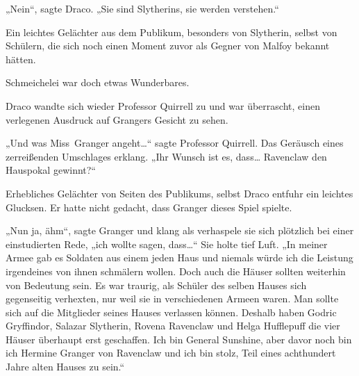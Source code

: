 „Nein“, sagte Draco. „Sie sind Slytherins, sie werden verstehen.“

Ein leichtes Gelächter aus dem Publikum, besonders von Slytherin, selbst von Schülern, die sich noch einen Moment zuvor als Gegner von Malfoy bekannt hätten.

Schmeichelei war doch etwas Wunderbares.

Draco wandte sich wieder Professor Quirrell zu und war überrascht, einen verlegenen Ausdruck auf Grangers Gesicht zu sehen.

„Und was Miss~Granger angeht…“ sagte Professor Quirrell. Das Geräusch eines zerreißenden Umschlages erklang. „Ihr Wunsch ist es, dass… Ravenclaw den Hauspokal gewinnt?“

Erhebliches Gelächter von Seiten des Publikums, selbst Draco entfuhr ein leichtes Glucksen. Er hatte nicht gedacht, dass Granger dieses Spiel spielte.

„Nun ja, ähm“, sagte Granger und klang als verhaspele sie sich plötzlich bei einer einstudierten Rede, „ich wollte sagen, dass…“ Sie holte tief Luft. „In meiner Armee gab es Soldaten aus einem jeden Haus und niemals würde ich die Leistung irgendeines von ihnen schmälern wollen. Doch auch die Häuser sollten weiterhin von Bedeutung sein. Es war traurig, als Schüler des selben Hauses sich gegenseitig verhexten, nur weil sie in verschiedenen Armeen waren. Man sollte sich auf die Mitglieder seines Hauses verlassen können. Deshalb haben Godric Gryffindor, Salazar Slytherin, Rovena Ravenclaw und Helga Hufflepuff die vier Häuser überhaupt erst geschaffen. Ich bin General Sunshine, aber davor noch bin ich Hermine Granger von Ravenclaw und ich bin stolz, Teil eines achthundert Jahre alten Hauses zu sein.“

